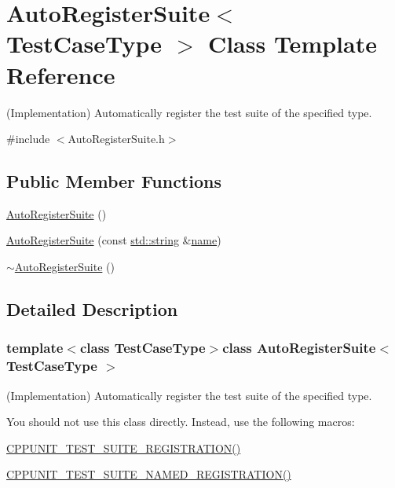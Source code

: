\hypertarget{class_auto_register_suite}{\section{Auto\-Register\-Suite$<$ Test\-Case\-Type $>$ Class Template Reference}
\label{class_auto_register_suite}
}


(Implementation) Automatically register the test suite of the specified type.  




{\ttfamily \#include $<$Auto\-Register\-Suite.\-h$>$}

\subsection*{Public Member Functions}
\begin{DoxyCompactItemize}
\item 
\hyperlink{class_auto_register_suite_a4c02d0d6e3de726f67b875dc5615e22a}{Auto\-Register\-Suite} ()
\item 
\hyperlink{class_auto_register_suite_a9350fa1995545aad03b61b7a6db690e4}{Auto\-Register\-Suite} (const \hyperlink{glew_8h_ae84541b4f3d8e1ea24ec0f466a8c568b}{std\-::string} \&\hyperlink{fmod__codec_8h_a5c4947d4516dd7cfa3505ce3a648a4ef}{name})
\item 
\hyperlink{class_auto_register_suite_af255683ee912f77fc9b7903c169c3324}{$\sim$\-Auto\-Register\-Suite} ()
\end{DoxyCompactItemize}


\subsection{Detailed Description}
\subsubsection*{template$<$class Test\-Case\-Type$>$class Auto\-Register\-Suite$<$ Test\-Case\-Type $>$}

(Implementation) Automatically register the test suite of the specified type. 

You should not use this class directly. Instead, use the following macros\-:
\begin{DoxyItemize}
\item \hyperlink{_helper_macros_8h_a2f4071eec88d1e306665ada0f2dd80e4}{C\-P\-P\-U\-N\-I\-T\-\_\-\-T\-E\-S\-T\-\_\-\-S\-U\-I\-T\-E\-\_\-\-R\-E\-G\-I\-S\-T\-R\-A\-T\-I\-O\-N()}
\item \hyperlink{_helper_macros_8h_a028a5855a40ad3836e2a26aa48cd4c91}{C\-P\-P\-U\-N\-I\-T\-\_\-\-T\-E\-S\-T\-\_\-\-S\-U\-I\-T\-E\-\_\-\-N\-A\-M\-E\-D\-\_\-\-R\-E\-G\-I\-S\-T\-R\-A\-T\-I\-O\-N()}
\end{DoxyItemize}

